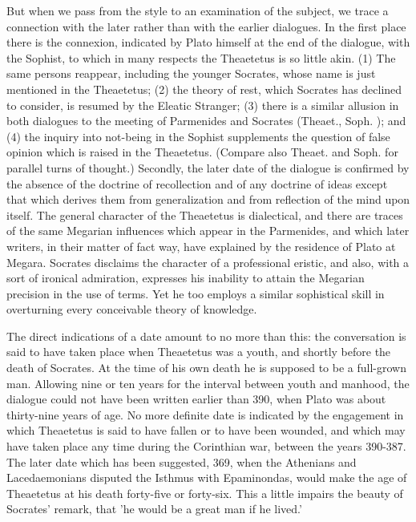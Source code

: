 \documentclass[11pt,letter]{article}
\begin{document}
\par  But when we pass from the style to an examination of the subject, we trace a connection with the later rather than with the earlier dialogues. In the first place there is the connexion, indicated by Plato himself at the end of the dialogue, with the Sophist, to which in many respects the Theaetetus is so little akin. (1) The same persons reappear, including the younger Socrates, whose name is just mentioned in the Theaetetus; (2) the theory of rest, which Socrates has declined to consider, is resumed by the Eleatic Stranger; (3) there is a similar allusion in both dialogues to the meeting of Parmenides and Socrates (Theaet., Soph. ); and (4) the inquiry into not-being in the Sophist supplements the question of false opinion which is raised in the Theaetetus. (Compare also Theaet. and Soph. for parallel turns of thought.) Secondly, the later date of the dialogue is confirmed by the absence of the doctrine of recollection and of any doctrine of ideas except that which derives them from generalization and from reflection of the mind upon itself. The general character of the Theaetetus is dialectical, and there are traces of the same Megarian influences which appear in the Parmenides, and which later writers, in their matter of fact way, have explained by the residence of Plato at Megara. Socrates disclaims the character of a professional eristic, and also, with a sort of ironical admiration, expresses his inability to attain the Megarian precision in the use of terms. Yet he too employs a similar sophistical skill in overturning every conceivable theory of knowledge.

\par  The direct indications of a date amount to no more than this: the conversation is said to have taken place when Theaetetus was a youth, and shortly before the death of Socrates. At the time of his own death he is supposed to be a full-grown man. Allowing nine or ten years for the interval between youth and manhood, the dialogue could not have been written earlier than 390, when Plato was about thirty-nine years of age. No more definite date is indicated by the engagement in which Theaetetus is said to have fallen or to have been wounded, and which may have taken place any time during the Corinthian war, between the years 390-387. The later date which has been suggested, 369, when the Athenians and Lacedaemonians disputed the Isthmus with Epaminondas, would make the age of Theaetetus at his death forty-five or forty-six. This a little impairs the beauty of Socrates' remark, that 'he would be a great man if he lived.'
\end{document}
